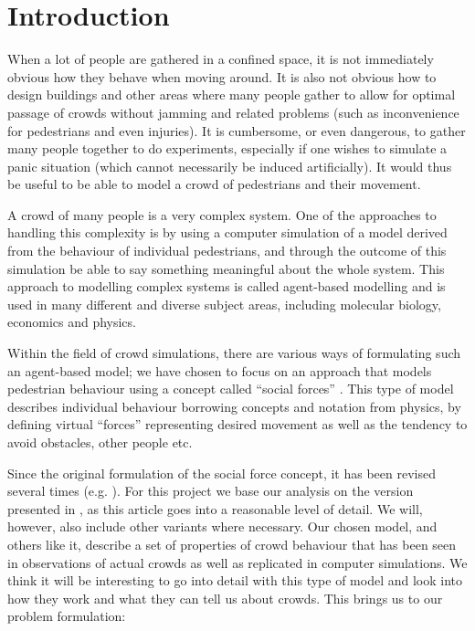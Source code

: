 \section{Introduction}
When a lot of people are gathered in a confined space, it is not immediately
obvious how they behave when moving around. It is also not obvious how to
design buildings and other areas where many people gather to allow for optimal
passage of crowds without jamming and related problems (such as inconvenience
for pedestrians and even injuries). It is cumbersome, or even dangerous, to
gather many people together to do experiments, especially if one wishes to
simulate a panic situation (which cannot necessarily be induced artificially).
It would thus be useful to be able to model a crowd of pedestrians and their
movement.

A crowd of many people is a very complex system. One of the approaches to
handling this complexity is by using a computer simulation of a model derived
from the behaviour of individual pedestrians, and through the outcome of this
simulation be able to say something meaningful about the whole system. This
approach to modelling complex systems is called agent-based modelling and is
used in many different and diverse subject areas, including molecular biology,
economics and physics.

Within the field of crowd simulations, there  are various ways of formulating
such an agent-based model; we have chosen to focus on an approach that models
pedestrian behaviour using a concept called ``social forces''
\cite{social-force}. This type of model describes individual behaviour
borrowing concepts and notation from physics, by defining  virtual ``forces''
representing desired movement as well as the tendency to avoid obstacles,
other people etc.

Since the original formulation of the social force concept, it has been
revised several times (e.g.  \cite{helbing00}). For this project we base our
analysis on the  version presented in \cite{self-org}, as this article goes
into a reasonable level of detail. We will, however, also include other
variants where necessary.  Our chosen model, and others like it, describe a
set of properties of crowd behaviour that has been seen in observations of
actual crowds as well as replicated in computer simulations.  We think it will
be interesting to go into detail with this type of model and look into how
they work and what they can tell us about crowds. This brings us to our
problem formulation:

